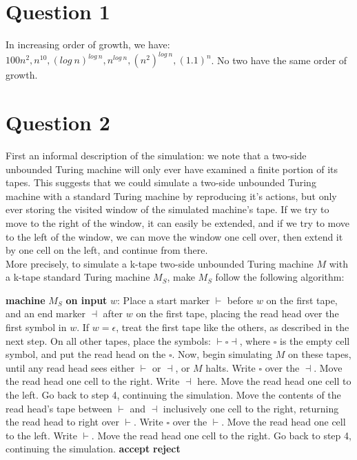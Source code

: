 \documentclass[a4paper,12pt]{scrartcl}
\newcommand{\Machine}[2]{\State \textbf{machine} #1 \textbf{on input} #2:}
\newcommand{\Reject}{\State \textbf{reject}}
\newcommand{\Accept}{\State \textbf{accept}}
\begin{document}
\section{Question 1}
In increasing order of growth, we have: $100n^2, n^{10}, (log\ n)^{log\ n}, n^{log\ n}, (n^2)^{log\ n}, (1.1)^n$. No two have the same order of growth.

\section{Question 2}
First an informal description of the simulation: we note that a two-side unbounded Turing machine will only ever have examined a finite portion of its tapes. This suggests that we could simulate a two-side unbounded Turing machine with a standard Turing machine by reproducing it's actions, but only ever storing the visited window of the simulated machine's tape. If we try to move to the right of the window, it can easily be extended, and if we try to move to the left of the window, we can move the window one cell over, then extend it by one cell on the left, and continue from there. \\
More precisely, to simulate a k-tape two-side unbounded Turing machine $M$ with a k-tape standard Turing machine $M_S$, make $M_S$ follow the following algorithm:

\begin{algorithmic}[1]
    \Machine{$M_S$}{$w$}
    \State Place a start marker $\vdash$ before $w$ on the first tape, and an end marker $\dashv$ after $w$ on the first tape, placing the read head over the first symbol in $w$. If $w = \epsilon$, treat the first tape like the others, as described in the next step.
    \State On all other tapes, place the symbols: $\vdash \square \dashv$, where $\square$ is the empty cell symbol, and put the read head on the $\square$.
    \State Now, begin simulating $M$ on these tapes, until any read head sees either $\vdash$ or $\dashv$, or $M$ halts.
        \State Write $\square$ over the $\dashv$.
        \State Move the read head one cell to the right.
        \State Write $\dashv$ here.
        \State Move the read head one cell to the left.
        \State Go back to step 4, continuing the simulation.
        \State Move the contents of the read head's tape between $\vdash$ and $\dashv$ inclusively one cell to the right, returning the read head to right over $\vdash$.
        \State Write $\square$ over the $\vdash$.
        \State Move the read head one cell to the left.
        \State Write $\vdash$.
        \State Move the read head one cell to the right.
        \State Go back to step 4, continuing the simulation.
        \Accept
        \Reject
    \EndIf
\end{algorithmic}
\end{document}
